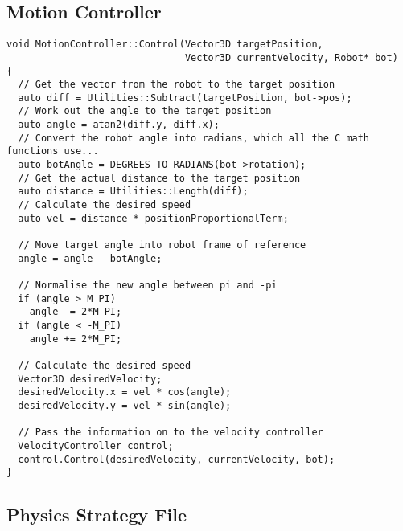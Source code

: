 \subsection{Motion Controller\label{app:motionControl}}

\begin{lstlisting}
void MotionController::Control(Vector3D targetPosition, 
                               Vector3D currentVelocity, Robot* bot)
{
  // Get the vector from the robot to the target position
  auto diff = Utilities::Subtract(targetPosition, bot->pos); 
  // Work out the angle to the target position
  auto angle = atan2(diff.y, diff.x);                        
  // Convert the robot angle into radians, which all the C math functions use...
  auto botAngle = DEGREES_TO_RADIANS(bot->rotation);         
  // Get the actual distance to the target position
  auto distance = Utilities::Length(diff);                   
  // Calculate the desired speed
  auto vel = distance * positionProportionalTerm;            

  // Move target angle into robot frame of reference
  angle = angle - botAngle;                                  

  // Normalise the new angle between pi and -pi
  if (angle > M_PI)
    angle -= 2*M_PI;
  if (angle < -M_PI)
    angle += 2*M_PI;

  // Calculate the desired speed
  Vector3D desiredVelocity;                                  
  desiredVelocity.x = vel * cos(angle);                 
  desiredVelocity.y = vel * sin(angle);

  // Pass the information on to the velocity controller
  VelocityController control;                                
  control.Control(desiredVelocity, currentVelocity, bot);    
}
\end{lstlisting}

\subsection{Physics Strategy File\label{app:physicsStrategy}}

